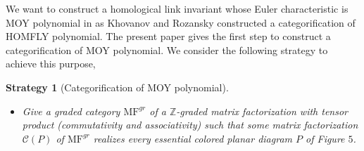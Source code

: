 \documentclass[10pt]{amsart}
\theoremstyle{break}
\newtheorem{str}[de]{Strategy}
\begin{document}
\indent We want to construct a homological link invariant whose Euler characteristic is MOY polynomial in \cite{MOY} as Khovanov and Rozansky constructed a categorification of HOMFLY polynomial. The present paper gives the first step to construct a categorification of MOY polynomial.
We consider the following strategy to achieve this purpose, 
\begin{str}[Categorification of MOY polynomial]\label{stra}
\indent\\
\begin{itemize}
\item[(S1)]Give a graded category ${{\mathrm{MF}}}^{gr}$ of a ${{\mathbb{Z}}}$-graded matrix factorization with tensor product (commutativity and associativity) such that some matrix factorization ${{\mathcal{C}}}\acute{}(P)$ of ${{\mathrm{MF}}}^{gr}$ realizes every essential colored planar diagram $P$ of Figure $5$.
\begin{figure}[htb]


\end{figure}
\end{itemize}
\end{str}
\end{document}
